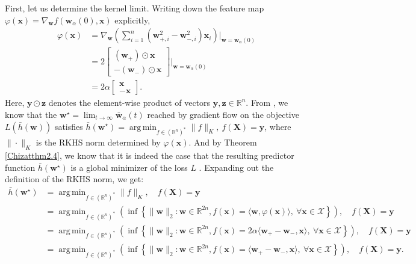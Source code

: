 \documentclass{article}
\DeclareMathOperator*{\argmin}{arg\,min}
\begin{document}
First, let us determine the kernel limit. Writing down the feature map $\varphi(\boldsymbol{x}) = \nabla_{\boldsymbol{w}} f(\boldsymbol{w}_{\alpha}(0), \boldsymbol{x})$ explicitly, 
\begin{align*}
    \varphi(\boldsymbol{x}) &= \nabla_{\boldsymbol{w}}\left( \sum_{i=1}^n(\boldsymbol{w}_{+, i}^2 - \boldsymbol{w}_{-, i}^2)\boldsymbol{x}_i \right)\bigg|_{\boldsymbol{w} = \boldsymbol{w}_{\alpha}(0)}\\
    &= 
    2\begin{bmatrix}
        (\boldsymbol{w}_+) \odot \boldsymbol{x}\\
        -(\boldsymbol{w}_-) \odot \boldsymbol{x}
    \end{bmatrix} \bigg|_{\boldsymbol{w} = \boldsymbol{w}_{\alpha}(0)}\\
    &= 2\alpha \begin{bmatrix}
        \boldsymbol{x}\\
        -\boldsymbol{x}
    \end{bmatrix}.
\end{align*}
Here, $\boldsymbol{y} \odot \boldsymbol{z}$ denotes the element-wise product of vectors $\boldsymbol{y}, \boldsymbol{z} \in \mathbb{R}^n$. From \cite{woodworth2020kernel}, we know that the $\boldsymbol{w}^{\star} = \lim_{t \to \infty} \boldsymbol{\bar{w}}_{\alpha}(t)$ reached by gradient flow on the objective $L(\bar{h}(\boldsymbol{w}))$ satisfies $\bar{h}(\boldsymbol{w}^{\star}) = \argmin_{f \in (\mathbb{R}^n)^*} \| f \|_{K}, \ f(\boldsymbol{X}) = \boldsymbol{y}$, where $\| \cdot \|_K$ is the RKHS norm determined by $\varphi(\boldsymbol{x})$. And by Theorem \ref{Chizatthm2.4}, we know that it is indeed the case that the resulting predictor function $\bar{h}(\boldsymbol{w}^{\star})$ is a global minimizer of the loss $L$ \cite{chizat2018lazy}. Expanding out the definition of the RKHS norm, we get:
\begin{align}
    \bar{h}(\boldsymbol{w}^{\star}) &= \argmin_{f \in (\mathbb{R}^n)^*} \| f \|_{K}, \quad f(\boldsymbol{X}) = \boldsymbol{y} \nonumber\\
    &= \argmin_{f \in (\mathbb{R}^n)^*} \left( \inf \left\{ \| \boldsymbol{w} \|_2 : \boldsymbol{w} \in \mathbb{R}^{2n},  f(\boldsymbol{x}) = \langle \boldsymbol{w}, \varphi(\boldsymbol{x}) \rangle, \ \forall \boldsymbol{x} \in \mathcal{X} \right\}\right), \quad f(\boldsymbol{X}) = \boldsymbol{y} \nonumber\\
    &= \argmin_{f \in (\mathbb{R}^n)^*} \left( \inf \left\{ \| \boldsymbol{w} \|_2 : \boldsymbol{w} \in \mathbb{R}^{2n},  f(\boldsymbol{x}) = 2\alpha \langle \boldsymbol{w}_+ - \boldsymbol{w}_-, \boldsymbol{x} \rangle, \ \forall \boldsymbol{x} \in \mathcal{X} \right\}\right), \quad f(\boldsymbol{X}) = \boldsymbol{y} \nonumber\\
    &= \argmin_{f \in (\mathbb{R}^n)^*} \left( \inf \left\{ \| \boldsymbol{w} \|_2 : \boldsymbol{w} \in \mathbb{R}^{2n},  f(\boldsymbol{x}) = \langle \boldsymbol{w}_+ - \boldsymbol{w}_-, \boldsymbol{x} \rangle, \ \forall \boldsymbol{x} \in \mathcal{X} \right\}\right), \quad f(\boldsymbol{X}) = \boldsymbol{y}.\label{RKHSnorm}
\end{align}
\end{document}
